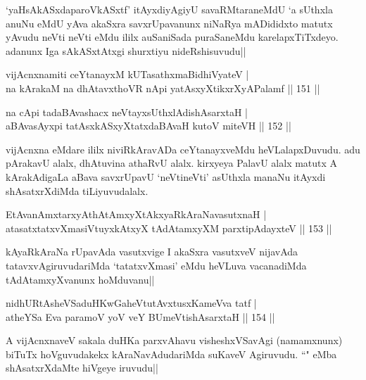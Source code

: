 \begin{artha}
`yaHsAkASxdaparoVkASxtf' itAyxdiyAgiyU savaRMtaraneMdU `a sUthxla anuNu eMdU yAva akaSxra savxrUpavanunx niNaRya mADididxto matutx yAvudu neVti neVti eMdu ililx auSaniSada puraSaneMdu karelapxTiTxdeyo. adanunx Iga sAkASxtAtxgi shurxtiyu nideRshisuvudu||
\end{artha}

\begin{shl}
vijAcnxnamiti ceYtanayxM kUTasathxmaBidhiVyateV |\\
na kArakaM na dhAtavxthoVR nApi yatAsxyXtikxrXyAPalamf \hfill || 151 ||
\end{shl}

\begin{shl}
na cApi tadaBAvashacx neVtayxsUthxlAdishAsarxtaH |\\
aBAvasAyxpi tatAsxkASxyXtatxdaBAvaH kutoV miteVH \hfill || 152 ||
\end{shl}

\begin{artha}
vijAcnxna eMdare ililx niviRkAravADa ceYtanayxveMdu heVLalapxDuvudu. adu pArakavU alalx, dhAtuvina athaRvU alalx. kirxyeya PalavU alalx matutx A kArakAdigaLa aBava savxrUpavU `neVtineVti' asUthxla manaNu itAyxdi shAsatxrXdiMda tiLiyuvudalalx.
\end{artha}


\begin{shl}
EtAvanAmxtarxyAthAtAmxyXtAkxyaRkAraNavasutxnaH |\\
atasatxtatxvXmasiVtuyxkAtxyX tAdAtamxyXM parxtipAdayxteV \hfill || 153 ||
\end{shl}

\begin{artha}
kAyaRkAraNa rUpavAda vasutxvige I akaSxra vasutxveV nijavAda tatavxvAgiruvudariMda `tatatxvXmasi' eMdu heVLuva vacanadiMda tAdAtamxyXvanunx hoMduvanu||
\end{artha}


\begin{shl}
nidhURtAsheVSaduHKwGaheVtutAvxtusxKameVva tatf |\\
atheYSa Eva paramoV yoV veY BUmeVtishAsarxtaH \hfill || 154 ||
\end{shl}

\begin{artha}
A vijAcnxnaveV sakala duHKa parxvAhavu visheshxVSavAgi (namamxnunx) biTuTx hoVguvudakekx kAraNavAdudariMda suKaveV Agiruvudu. ``\stext " eMba shAsatxrXdaMte hiVgeye iruvudu||
\end{artha}

